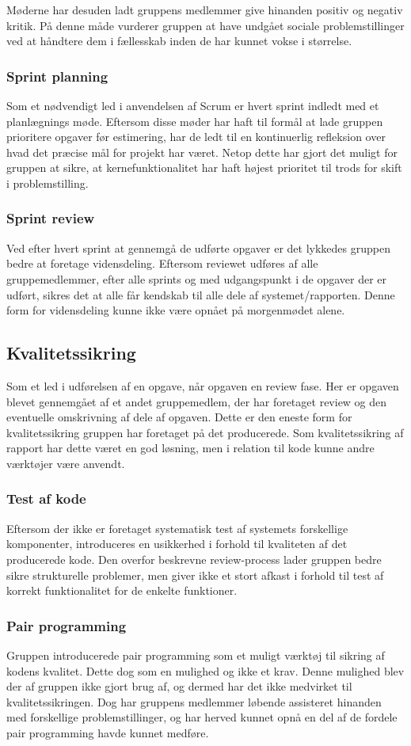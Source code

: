 Møderne har desuden ladt gruppens medlemmer give hinanden positiv og negativ kritik.
På denne måde vurderer gruppen at have undgået sociale problemstillinger ved at håndtere dem i fællesskab inden de har kunnet vokse i størrelse.

\subsubsection{Sprint planning}
Som et nødvendigt led i anvendelsen af Scrum er hvert sprint indledt med et planlægnings møde.
Eftersom disse møder har haft til formål at lade gruppen prioritere opgaver før estimering, har de ledt til en kontinuerlig refleksion over hvad det præcise mål for projekt har været.
Netop dette har gjort det muligt for gruppen at sikre, at kernefunktionalitet har haft højest prioritet til trods for skift i problemstilling.

\subsubsection{Sprint review}
Ved efter hvert sprint at gennemgå de udførte opgaver er det lykkedes gruppen bedre at foretage vidensdeling.
Eftersom reviewet udføres af alle gruppemedlemmer, efter alle sprints og med udgangspunkt i de opgaver der er udført, sikres det at alle får kendskab til alle dele af systemet/rapporten.
Denne form for vidensdeling kunne ikke være opnået på morgenmødet alene.

\subsection{Kvalitetssikring}
Som et led i udførelsen af en opgave, når opgaven en review fase.
Her er opgaven blevet gennemgået af et andet gruppemedlem, der har foretaget review og den eventuelle omskrivning af dele af opgaven.
Dette er den eneste form for kvalitetssikring gruppen har foretaget på det producerede.
Som kvalitetssikring af rapport har dette været en god løsning, men i relation til kode kunne andre værktøjer være anvendt.

\subsubsection{Test af kode}
Eftersom der ikke er foretaget systematisk test af systemets forskellige komponenter, introduceres en usikkerhed i forhold til kvaliteten af det producerede kode.
Den overfor beskrevne review-process lader gruppen bedre sikre strukturelle problemer, men giver ikke et stort afkast i forhold til test af korrekt funktionalitet for de enkelte funktioner.

\subsubsection{Pair programming}
Gruppen introducerede pair programming som et muligt værktøj til sikring af kodens kvalitet.
Dette dog som en mulighed og ikke et krav.
Denne mulighed blev der af gruppen ikke gjort brug af, og dermed har det ikke medvirket til kvalitetssikringen.
Dog har gruppens medlemmer løbende assisteret hinanden med forskellige problemstillinger, og har herved kunnet opnå en del af de fordele pair programming havde kunnet medføre.